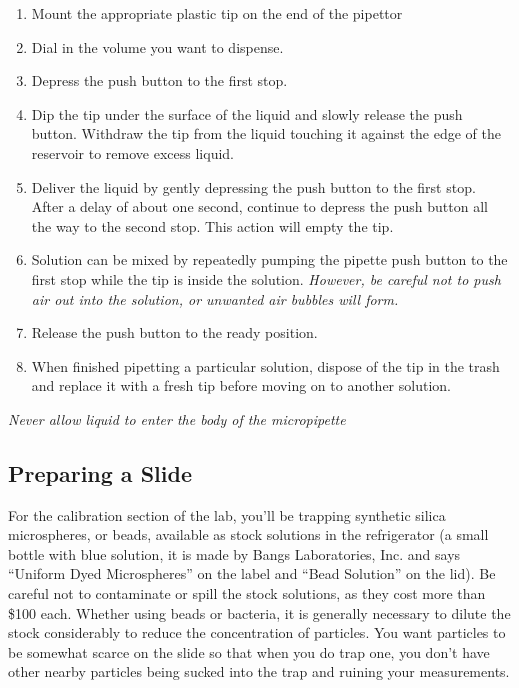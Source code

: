 \documentclass{../lab}
\begin{document}
\begin{enumerate}
    \item Mount the appropriate plastic tip on the end of the pipettor

    \item Dial in the volume you want to dispense.

    \item Depress the push button to the first stop.

    \item Dip the tip under the surface of the liquid and slowly release the push button. Withdraw the tip from the liquid touching it against the edge of the reservoir to remove excess liquid.

    \item Deliver the liquid by gently depressing the push button to the first stop. After a delay of about one second, continue to depress the push button all the way to the second stop. This action will empty the tip.

    \item Solution can be mixed by repeatedly pumping the pipette push button to the first stop while the tip is inside the solution. \emph{However, be careful not to push air out into the solution, or unwanted air bubbles will form.}

    \item Release the push button to the ready position.

    \item When finished pipetting a particular solution, dispose of the tip in the trash and replace it with a fresh tip before moving on to another solution.
\end{enumerate}

\emph{Never allow liquid to enter the body of the micropipette}

\subsection{Preparing a Slide}

\newpage

For the calibration section of the lab, you'll be trapping synthetic silica microspheres, or beads, available as stock solutions in the refrigerator (a small bottle with blue solution, it is made by Bangs Laboratories, Inc. and says ``Uniform Dyed Microspheres'' on the label and ``Bead Solution'' on the lid). Be careful not to contaminate or spill the stock solutions, as they cost more than \$100 each. Whether using beads or bacteria, it is generally necessary to dilute the stock considerably to reduce the concentration of particles. You want particles to be somewhat scarce on the slide so that when you do trap one, you don't have other nearby particles being sucked into the trap and ruining your measurements.
\end{document}
